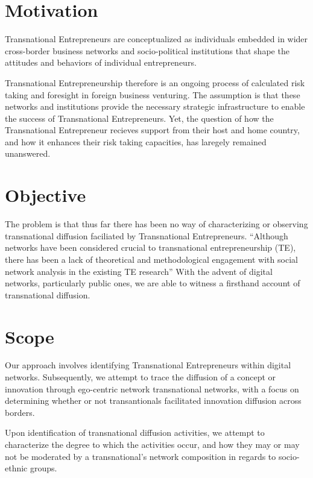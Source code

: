 \section{Motivation}
Transnational Entrepreneurs are conceptualized as individuals embedded
in wider cross-border business networks and socio-political
institutions that shape the attitudes and behaviors of individual
entrepreneurs.

Transnational Entrepreneurship therefore is an ongoing process of
calculated risk taking and foresight in foreign business
venturing. The assumption is that these networks and institutions
provide the necessary strategic infrastructure to enable the success
of Transnational Entrepreneurs. Yet, the question of how the
Transnational Entrepreneur recieves support from their host and home
country, and how it enhances their risk taking capacities, has
laregely remained unanswered.

\section{Objective}
The problem is that thus far there has been no way of characterizing
or observing transnational diffusion faciliated by Transnational
Entrepreneurs. ``Although networks have been considered crucial to
transnational entrepreneurship (TE), there has been a lack of
theoretical and methodological engagement with social network analysis
in the existing TE research''\cite{Chen.2009} With the advent of
digital networks, particularly public ones, we are able to witness a
firsthand account of transnational diffusion.

\section{Scope}
Our approach involves identifying Transnational Entrepreneurs within
digital networks. Subsequently, we attempt to trace the diffusion of a
concept or innovation through ego-centric network transnational
networks, with a focus on determining whether or not transantionals
facilitated innovation diffusion across borders.

Upon identification of transnational diffusion activities, we attempt
to characterize the degree to which the activities occur, and how they
may or may not be moderated by a transnational's network composition
in regards to socio-ethnic groups.
